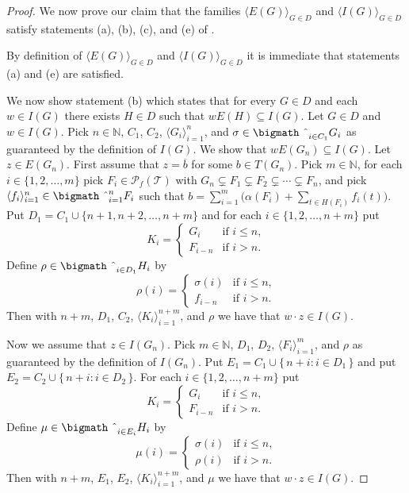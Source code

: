 \documentclass[12pt,showtrims]{memoir}
\theoremstyle{plain}
\theoremstyle{definition}
\newcommand{\la}{\langle}
\newcommand{\ra}{\rangle}
\newcommand{\bbN}{\mathbb{N}}
\newcommand{\calT}{\mathcal{T}}
\newcommand{\Pf}{\mathcal{P}_f}
\newcommand{\bigtimes}{\hbox{\bigmath \char'2}}
\begin{document}
\begin{proof}
  We now prove our claim that the families $\la E(G) \ra_{G \in D}$ and $\la I(G) \ra_{G \in D}$ satisfy statements (a), (b), (c), and (e) of \cite[Lemma 14.9]{Hindman:1998fk}.

  By definition of $\la E(G) \ra_{G \in D}$ and $\la I(G) \ra_{G \in D}$ it is immediate that statements (a) and (e) are satisfied. 

  We now show statement (b) which states that for every $G \in D$ and each $w \in I(G)$ there exists $H \in D$ such that $w E(H) \subseteq I(G)$.
  Let $G \in D$ and $w \in I(G)$. 
  Pick $n \in \bbN$, $C_1$, $C_2$, $\la G_i \ra_{i=1}^n$, and $\sigma \in \bigtimes_{i \in C_1} G_i$ as guaranteed by the definition of $I(G)$.
  We show that $w E(G_n) \subseteq I(G)$. 
  Let $z \in E(G_n)$. 
  First assume that $z = \overline{b}$ for some $b \in T(G_n)$. 
  Pick $m \in \bbN$, for each $i \in \{1, 2, \ldots, m\}$ pick $F_i \in \Pf(\calT)$ with $G_n \subsetneq F_1 \subsetneq F_2 \subsetneq \cdots \subsetneq F_n$, and pick $\la f_i \ra_{i=1}^n \in \bigtimes_{i=1}^n F_i$ such that $b = \sum_{i=1}^m \bigl( \alpha(F_i) + \sum_{t \in H(F_i)} f_i(t) \bigr)$. 
  Put $D_1 = C_1 \cup \{n+1, n+2, \ldots, n+m\}$ and for each $i \in \{1, 2, \ldots, n+m\}$ put 
  \[
    K_i = 
    \begin{cases}
      G_i & \mbox{if $i \le n$,} \\
      F_{i-n} & \mbox{if $i > n$.}
    \end{cases}
  \]
  Define $\rho \in \bigtimes_{i \in D_1} H_i$ by 
  \[
    \rho(i) =
    \begin{cases}
      \sigma(i) & \mbox{if $i \le n$,} \\
      f_{i-n} & \mbox{if $i > n$.}
    \end{cases}
  \]
  Then with $n+m$, $D_1$, $C_2$, $\la K_i \ra_{i=1}^{n+m}$, and $\rho$ we have that $w \cdot z \in I(G)$. 

  Now we assume that $z \in I(G_n)$. 
  Pick $m \in \bbN$, $D_1$, $D_2$, $\la F_i \ra_{i=1}^m$, and $\rho$ as guaranteed by the definition of $I(G_n)$. 
  Put $E_1 = C_1 \cup \{\,n + i : i \in D_1 \,\}$ and put $E_2 = C_2 \cup \{\, n + i : i \in D_2 \,\}$.
  For each $i \in \{1, 2, \ldots, n+m\}$ put
  \[
    K_i = 
    \begin{cases}
      G_i & \mbox{if $i \le n$,} \\
      F_{i-n} & \mbox{if $i > n$.}
    \end{cases}
  \]
  Define $\mu \in \bigtimes_{i \in E_i} H_i$ by
  \[
    \mu(i) = 
    \begin{cases}
      \sigma(i) & \mbox{if $i \le n$,} \\
      \rho(i) & \mbox{if $i > n$.}
    \end{cases}
  \]
  Then with $n+m$, $E_1$, $E_2$, $\la K_i \ra_{i=1}^{n+m}$, and $\mu$ we have that $w \cdot z \in I(G)$.


\end{proof}
\end{document}
